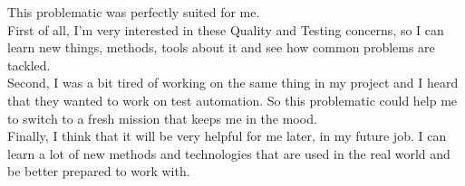 This problematic was perfectly suited for me. \\
First of all, I'm very interested in these Quality and Testing concerns,
so I can learn new things, methods, tools about it and see how common
problems are tackled. \\
Second, I was a bit tired of working on the same thing in my project and
I heard that they wanted to work on test automation.
So this problematic could help me to switch to a fresh mission that keeps
me in the mood. \\
Finally, I think that it will be very helpful for me later, in my future
job.
I can learn a lot of new methods and technologies that are used in the
real world and be better prepared to work with.